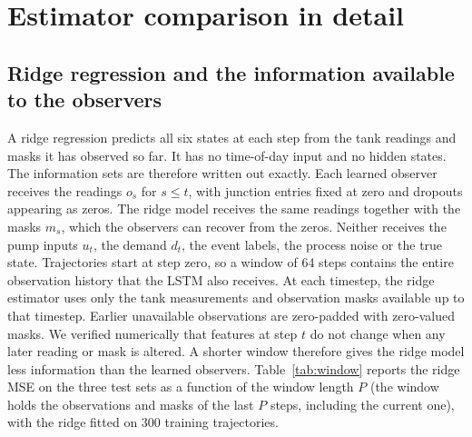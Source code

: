 \documentclass[conference]{IEEEtran}
\begin{document}
\begin{table}[t]
\centering
\caption{Placement criteria: weak-direction variance relative to the best set.}
\label{tab:placement_weak}
\small
{}
\end{table}

\section{Estimator comparison in detail}
\label{app:estimators}

\subsection{Ridge regression and the information available to the observers}
\label{sec:linear}

A ridge regression predicts all six states at each step from the tank readings and masks it has observed so far. It has no time-of-day input and no hidden states. The information sets are therefore written out exactly. Each learned observer receives the readings $o_s$ for $s\le t$, with junction entries fixed at zero and dropouts appearing as zeros. The ridge model receives the same readings together with the masks $m_s$, which the observers can recover from the zeros. Neither receives the pump inputs $u_t$, the demand $d_t$, the event labels, the process noise or the true state. Trajectories start at step zero, so a window of 64 steps contains the entire observation history that the LSTM also receives. At each timestep, the ridge estimator uses only the tank measurements and observation masks available up to that timestep. Earlier unavailable observations are zero-padded with zero-valued masks. We verified numerically that features at step $t$ do not change when any later reading or mask is altered. A shorter window therefore gives the ridge model less information than the learned observers. Table~\ref{tab:window} reports the ridge MSE on the three test sets as a function of the window length $P$ (the window holds the observations and masks of the last $P$ steps, including the current one), with the ridge fitted on 300 training trajectories.
\end{document}
